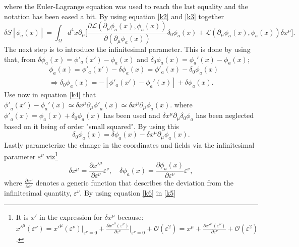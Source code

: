 where the Euler-Lagrange equation was used to reach the last equality and the notation has been eased a bit. By using equation \eqref{k2} and \eqref{k3} together
\begin{equation}
	\delta S[\phi_a(x)]=\int_{\Omega}d^4x \partial_\mu\bigg[\frac{\partial \mathcal{L}(\partial_\mu\phi_a(x),\phi_a(x))}{\partial (\partial_\mu \phi_a(x))}\delta_0\phi_a(x)+\mathcal{L}(\partial_\mu\phi_a(x),\phi_a(x))\delta x^\mu\bigg].
	\label{k7}
\end{equation} 
The next step is to introduce the infinitesimal parameter. This is done by using that, from $\delta\phi_a(x)=\phi'_a(x')-\phi_a(x)$ and $\delta_0\phi_a(x)=\phi_a'(x)-\phi_a(x)$;
\begin{equation}
	\begin{split}
		&\phi_a(x)=\phi'_a(x')-\delta\phi_a(x)=\phi'_a(x)-\delta_0\phi_a(x)\\
		&\Rightarrow\delta_0\phi_a(x)=-[\phi'_a(x')-\phi_a'(x)]+\delta\phi_a(x).
	\end{split}
	\label{k4}
\end{equation}  
Use now in equation \eqref{k4} that ${\phi'}_a(x')-\phi_a'(x)\simeq \delta x^\mu\partial_\mu{\phi'}_a(x)\simeq \delta x^\mu\partial_\mu\phi_a(x)$. where ${\phi'}_a(x)=\phi_a(x)+\delta_0\phi_a(x)$ has been used and $\delta x^\mu\partial_\mu\delta_0\phi_a$ has been neglected based on it being of order "small squared". By using this
\begin{equation}
	\delta_0\phi_a(x)=\delta\phi_a(x)-\delta x^\mu\partial_\mu\phi_a(x).
	\label{k5}
\end{equation}  
Lastly parameterize the change in the coordinates and fields via the infinitesimal parameter $\varepsilon^\nu$ viz\footnote{It is $x'$ in the expression for $\delta x^\mu$ because: ${x'}^\mu(\varepsilon^\nu)={x'}^\mu(\varepsilon^\nu)|_{\varepsilon^\nu=0}+\frac{\partial {x'}^\mu(\varepsilon^\nu)}{\partial \varepsilon^\nu}\big|_{\varepsilon^\nu=0}+\mathcal{O}(\varepsilon^2)={x}^\mu+\frac{\partial {x'}^\mu(\varepsilon^\nu)}{\partial \varepsilon^\nu}+\mathcal{O}(\varepsilon^2)$.}
\begin{equation}
	\delta x^\mu =\frac{\partial {x'}^\mu}{\partial \varepsilon^\nu}\varepsilon^\nu, \quad \delta \phi_a(x)=\frac{\partial \phi_a(x)}{\partial \varepsilon^\nu}\varepsilon^\nu,
	\label{k6}
\end{equation} 
where $\frac{\partial x^\mu}{\partial \varepsilon^\nu}$ denotes a generic function that describes the deviation from the infinitesimal quantity, $\varepsilon^\nu$. By using equation \eqref{k6} in \eqref{k5}
